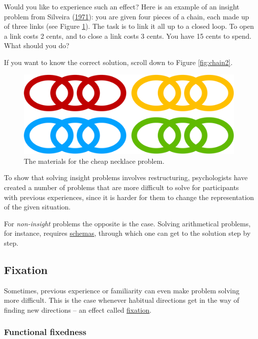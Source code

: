 \documentclass[
]{krantz}
\begin{document}
Would you like to experience such an effect? Here is an example of an insight problem from Silveira (\protect\hyperlink{ref-silveira1971incubation}{1971}): you are given four pieces of a chain, each made up of three links (see Figure \ref{fig:chain1}). The task is to link it all up to a closed loop. To open a link costs 2 cents, and to close a link costs 3 cents. You have 15 cents to spend. What should you do?

If you want to know the correct solution, scroll down to Figure \ref{fig:chain2}.

\begin{figure}

{\centering \includegraphics[width=0.6\linewidth]{images/ch10/chain1} 

}

\caption{The materials for the cheap necklace problem.}\label{fig:chain1}
\end{figure}

To show that solving insight problems involves restructuring, psychologists have created a number of problems that are more difficult to solve for participants with previous experiences, since it is harder for them to change the representation of the given situation.

For \emph{non-insight} problems the opposite is the case. Solving arithmetical problems, for instance, requires \protect\hyperlink{schemas}{schemas}, through which one can get to the solution step by step.

\hypertarget{fixation}{%
\subsection*{Fixation}\label{fixation}}


Sometimes, previous experience or familiarity can even make problem solving more difficult. This is the case whenever habitual directions get in the way of finding new directions -- an effect called \protect\hyperlink{fixation}{fixation}.

\hypertarget{functional-fixedness}{%
\subsubsection*{Functional fixedness}\label{functional-fixedness}}
\end{document}
